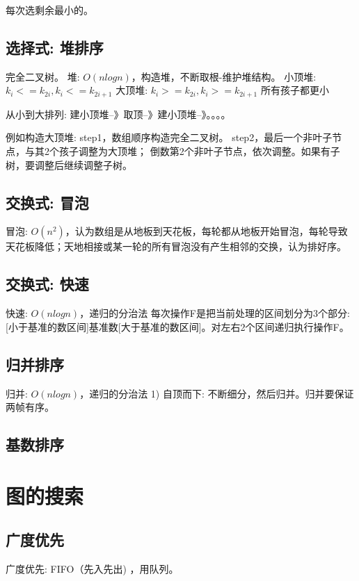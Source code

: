 \documentclass[UTF8]{../computerUniverse}
\begin{document}
每次选剩余最小的。


\subsection{选择式: 堆排序}
完全二叉树。
堆: $O(nlogn)$，构造堆，不断取根-维护堆结构。
小顶堆: $k_i<=k_{2i}, k_i<=k_{2i+1}$
大顶堆: $k_i>=k_{2i}, k_i>=k_{2i+1}$ 所有孩子都更小

从小到大排列: 建小顶堆--》取顶--》建小顶堆--》。。。。

例如构造大顶堆: 
step1，数组顺序构造完全二叉树。
step2，最后一个非叶子节点，与其2个孩子调整为大顶堆；
       倒数第2个非叶子节点，依次调整。如果有子树，要调整后继续调整子树。
       

\subsection{交换式: 冒泡}
冒泡: $O(n^2)$，认为数组是从地板到天花板，每轮都从地板开始冒泡，每轮导致天花板降低；天地相接或某一轮的所有冒泡没有产生相邻的交换，认为排好序。


\subsection{交换式: 快速}    
快速: $O(nlogn)$，递归的分治法
每次操作F是把当前处理的区间划分为3个部分: [小于基准的数区间]基准数[大于基准的数区间]。对左右2个区间递归执行操作F。


\subsection{归并排序}

归并: $O(nlogn)$，递归的分治法
1) 自顶而下: 不断细分，然后归并。归并要保证两帧有序。


\subsection{基数排序}




\section{图的搜索}

\subsection{广度优先}
广度优先: FIFO（先入先出) ，用队列。
\end{document}
